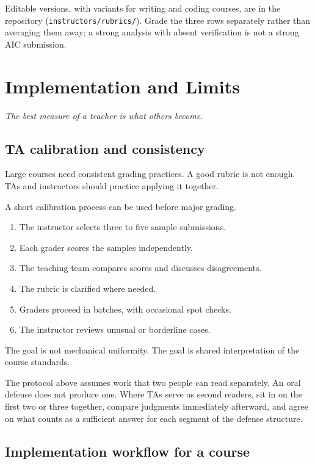 \documentclass{SIAMbook2023}
\newcommand{\bookepigraph}[1]{%
  \begin{center}%
    \begin{minipage}{0.78\textwidth}%
      \centering\itshape #1%
    \end{minipage}%
  \end{center}%
  \vspace{0.6em}%
}
\begin{document}
Editable versions, with variants for writing and coding courses, are in the repository (\texttt{instructors/rubrics/}). Grade the three rows separately rather than averaging them away; a strong analysis with absent verification is not a strong AIC submission.

\chapter{Implementation and Limits}
\label{i:ch:implementation-and-limits}%

\bookepigraph{The best measure of a teacher is what others become.}

\section{TA calibration and consistency}
\label{i:sec:ta-calibration}%

Large courses need consistent grading practices. A good rubric is not enough. TAs and instructors should practice applying it together.

A short calibration process can be used before major grading.

\begin{enumerate}
\item The instructor selects three to five sample submissions.
\item Each grader scores the samples independently.
\item The teaching team compares scores and discusses disagreements.
\item The rubric is clarified where needed.
\item Graders proceed in batches, with occasional spot checks.
\item The instructor reviews unusual or borderline cases.
\end{enumerate}

The goal is not mechanical uniformity. The goal is shared interpretation of the course standards.

The protocol above assumes work that two people can read separately. An oral defense does not produce one. Where TAs serve as second readers, sit in on the first two or three together, compare judgments immediately afterward, and agree on what counts as a sufficient answer for each segment of the defense structure.

\section{Implementation workflow for a course}
\label{i:sec:workflow}%
\end{document}
